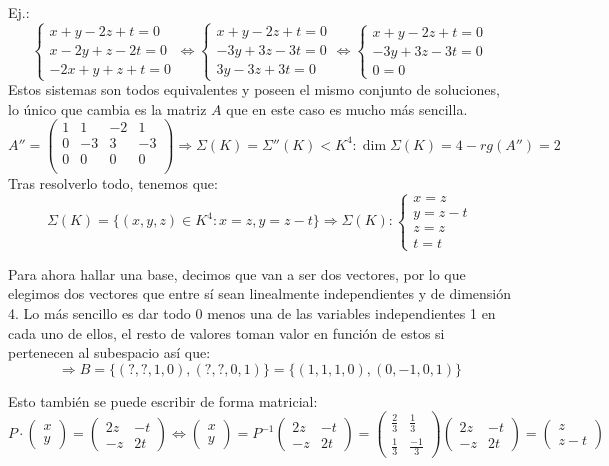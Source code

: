 \documentclass[10pt,a4paper,openright]{book}
\begin{document}
Ej.:
$$\begin{cases}x+y-2z+t=0 \\
x-2y+z-2t=0 \\
-2x+y+z+t=0\end{cases}\Leftrightarrow \begin{cases}x+y-2z+t=0 \\
-3y+3z-3t=0 \\
3y-3z+3t=0\end{cases}\Leftrightarrow \begin{cases}x+y-2z+t=0 \\
-3y+3z-3t=0 \\
0=0\end{cases}$$
Estos sistemas son todos equivalentes y poseen el mismo conjunto de soluciones, lo único que cambia es la matriz $A$ que en este caso es mucho más sencilla.
$$A''=\begin{pmatrix}
1 & 1 & -2 & 1 \\
0 & -3 & 3 & -3 \\
0 & 0 & 0 & 0 \\
\end{pmatrix}\Rightarrow \Sigma(K)=\Sigma ''(K)<K^4: \dim \Sigma (K)=4-rg(A'')=2$$
Tras resolverlo todo, tenemos que:
$$\Sigma(K)=\{(x,y,z)\in K^4: x=z, y=z-t\}\Rightarrow \Sigma(K):\begin{cases} x=z \\ y=z-t \\ z=z \\ t=t\end{cases}$$

Para ahora hallar una base, decimos que van a ser dos vectores, por lo que elegimos dos vectores que entre sí sean linealmente independientes y de dimensión 4. Lo más sencillo es dar todo 0 menos una de las variables independientes 1 en cada uno de ellos, el resto de valores toman valor en función de estos si pertenecen al subespacio así que:
$$\Rightarrow B=\{(?,?,1,0),(?,?,0,1)\}=\{(1,1,1,0),(0,-1,0,1)\}$$

Esto también se puede escribir de forma matricial:
$$P\cdot \begin{pmatrix} x \\ y\end{pmatrix}=\begin{pmatrix} 2z & -t \\ -z & 2t \end{pmatrix}\Leftrightarrow \begin{pmatrix} x \\ y\end{pmatrix}=P^{-1}\begin{pmatrix} 2z & -t \\ -z & 2t \end{pmatrix}= \begin{pmatrix} \frac{2}{3} & \frac{1}{3} \\ \frac{1}{3}& \frac{-1}{3}\end{pmatrix}\begin{pmatrix} 2z & -t \\ -z & 2t \end{pmatrix}= \begin{pmatrix}
z \\ z-t
\end{pmatrix}$$
\end{document}
